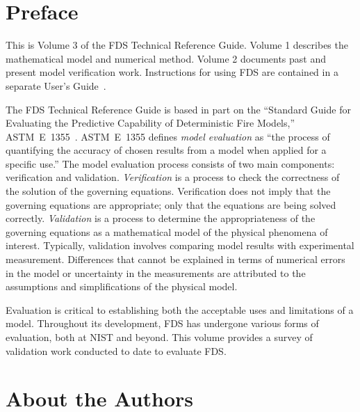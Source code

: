 \documentclass[11pt]{book}
\begin{document}
\pagestyle{plain}


\chapter{Preface}

This is Volume 3 of the FDS Technical Reference Guide. Volume 1 describes the mathematical model and numerical method. Volume 2 documents past and
present model verification work. Instructions for using FDS are contained in a separate User's Guide~\cite{FDS_Users_Guide_5}.

The FDS Technical Reference Guide is based in part on the ``Standard Guide for Evaluating the Predictive Capability of
Deterministic Fire Models,'' ASTM~E~1355~\cite{ASTM:E1355}. ASTM~E~1355 defines {\em model evaluation} as ``the process of quantifying the accuracy
of chosen results from a model when applied for a specific use.'' The model evaluation process consists of two main components: verification and
validation. {\em Verification} is a process to check the correctness of the solution of the governing equations. Verification does not imply that the
governing equations are appropriate; only that the equations are being solved correctly. {\em Validation} is a process to determine the
appropriateness of the governing equations as a mathematical model of the physical phenomena of interest. Typically, validation involves comparing
model results with experimental measurement. Differences that cannot be explained in terms of numerical errors in the model or uncertainty in the
measurements are attributed to the assumptions and simplifications of the physical model.

Evaluation is critical to establishing both the acceptable uses and limitations of a model. Throughout its development, FDS has undergone various
forms of evaluation, both at NIST and beyond. This volume provides a survey of validation work conducted to date to evaluate FDS.


\chapter{About the Authors}
\end{document}
